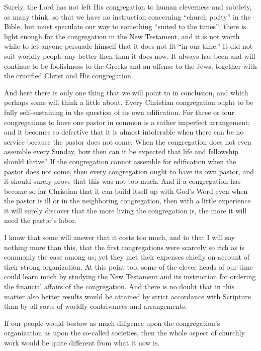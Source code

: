 Surely, the Lord has not left His congregation to human cleverness and subtlety, as many think, so that we have no instruction concerning “church polity” in the Bible, but must speculate our way to something “suited to the times”; there is light enough for the congregation in the New Testament, and it is not worth while to let anyone persuade himself that it does not fit “in our time.” It did not suit worldly people any better then than it does now. It always has been and will continue to be foolishness to the Greeks and an offense to the Jews, together with the crucified Christ and His congregation.

And here there is only one thing that we will point to in conclusion, and which perhaps some will think a little about. Every Christian congregation ought to be fully self-sustaining in the question of its own edification. For three or four congregations to have one pastor in common is a rather imperfect arrangement; and it becomes so defective that it is almost intolerable when there can be no service because the pastor does not come. When the congregation does not even assemble every Sunday, how then can it be expected that life and fellowship should thrive? If the congregation cannot assemble for edification when the pastor does not come, then every congregation ought to have its own pastor, and it should surely prove that this was not too much. And if a congregation has become so far Christian that it can build itself up with God’s Word even when the pastor is ill or in the neighboring congregation, then with a little experience it will surely discover that the more living the congregation is, the more it will need the pastor’s labor.

I know that some will answer that it costs too much, and to that I will say nothing more than this, that the first congregations were scarcely so rich as is commonly the case among us; yet they met their expenses chiefly on account of their strong organization. At this point too, some of the clever heads of our time could learn much by studying the New Testament and its instruction for ordering the financial affairs of the congregation. And there is no doubt that in this matter also better results would be attained by strict accordance with Scripture than by all sorts of worldly contrivances and arrangements.

If our people would bestow as much diligence upon the congregation’s organization as upon the so-called societies, then the whole aspect of churchly work would be quite different from what it now is.

